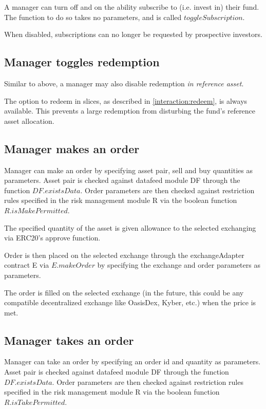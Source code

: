 \documentclass[conference]{IEEEtran}
\begin{document}
A manager can turn off and on the ability subscribe to (i.e. invest in) their fund.
The function to do so takes no parameters, and is called $toggleSubscription$.

When disabled, subscriptions can no longer be requested by prospective investors.

\subsection{Manager toggles redemption}

Similar to above, a manager may also disable redemption \textit{in reference asset}.

The option to redeem in slices, as described in \ref{interaction:redeem}, is always available. This prevents a large redemption from disturbing the fund's reference asset allocation.

\subsection{Manager makes an order}

Manager can make an order by specifying asset pair, sell and buy quantities as parameters. Asset pair is checked against datafeed module DF through the function $DF.existsData$. Order parameters are then checked against restriction rules specified in the risk management module R via the boolean function $R.isMakePermitted$.

The specified quantity of the asset is given allowance to the selected exchanging via ERC20's approve function.

Order is then placed on the selected exchange through the exchangeAdapter contract E via $E.makeOrder$ by specifying the exchange and order parameters as parameters.

The order is filled on the selected exchange (in the future, this could be any compatible decentralized exchange like OasisDex, Kyber, etc.) when the price is met.

\subsection{Manager takes an order}

Manager can take an order by specifying an order id and quantity as parameters. Asset pair is checked against datafeed module DF through the function $DF.existsData$. Order parameters are then checked against restriction rules specified in the risk management module R via the boolean function $R.isTakePermitted$.
\end{document}
